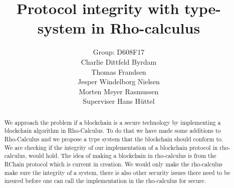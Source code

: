 \mainmatter  %

\title{Protocol integrity with type-system in Rho-calculus}




\author{Group: D608F17\\Charlie Dittfeld Byrdam\\Thomas Frandsen\\Jesper Windelborg Nielsen\\Morten Meyer Rasmussen\\Superviser Hans Hüttel}




\toctitle{}
\tocauthor{}
\maketitle
\clearpage
\begin{abstract}
We approach the problem if a blockchain is a secure technology by implementing a blockchain algorithm in Rho-Calculus. To do that we have made some additions to Rho-Calculus and we propose a type system that the blockchain should conform to. We are checking if the integrity of our implementation of a blockchain protocol in rho-calculus, would hold. The idea of making a blockchain in rho-calculus is from the RChain protocol which is current in creation. We would only make the rho-calculus make sure the integrity of a system, there is also other security issues there need to be insured before one can call the implementation in the rho-calculus for secure.
\end{abstract}
